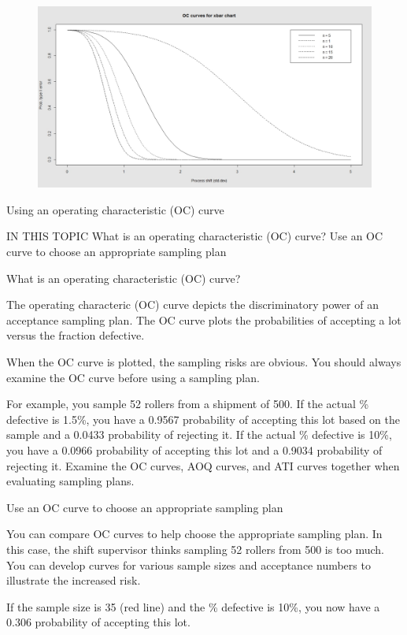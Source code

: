\documentclass[SPC-MASTER.tex]{subfiles}
\begin{document}
\begin{figure}
\centering
\includegraphics[width=0.7\linewidth]{images/OCpistonrings}
\caption{}
\label{fig:OCpistonrings}
\end{figure}



Using an operating characteristic (OC) curve

IN THIS TOPIC
What is an operating characteristic (OC) curve?
Use an OC curve to choose an appropriate sampling plan

	What is an operating characteristic (OC) curve?
	
	The operating characteric (OC) curve depicts the discriminatory power of an acceptance sampling plan. The OC curve plots the probabilities of accepting a lot versus the fraction defective.
	
	When the OC curve is plotted, the sampling risks are obvious. You should always examine the OC curve before using a sampling plan.

	
	For example, you sample 52 rollers from a shipment of 500. If the actual \% defective is 1.5\%, you have a 0.9567 probability of accepting this lot based on the sample and a 0.0433 probability of rejecting it. If the actual \% defective is 10\%, you have a 0.0966 probability of accepting this lot and a 0.9034 probability of rejecting it.
	Examine the OC curves, AOQ curves, and ATI curves together when evaluating sampling plans.

	Use an OC curve to choose an appropriate sampling plan
	
	You can compare OC curves to help choose the appropriate sampling plan. In this case, the shift supervisor thinks sampling 52 rollers from 500 is too much. You can develop curves for various sample sizes and acceptance numbers to illustrate the increased risk.
	
	If the sample size is 35 (red line) and the \% defective is 10\%, you now have a 0.306 probability of accepting this lot.

\end{document}
